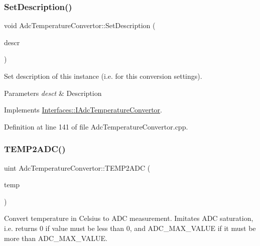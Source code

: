 \subsubsection{\texorpdfstring{Set\+Description()}{SetDescription()}}
{\footnotesize\ttfamily void Adc\+Temperature\+Convertor\+::\+Set\+Description (\begin{DoxyParamCaption}\item[{Q\+String}]{descr }\end{DoxyParamCaption})\hspace{0.3cm}{\ttfamily [virtual]}}



Set description of this instance (i.\+e. for this conversion settings). 


\begin{DoxyParams}{Parameters}
{\em desct} & Description \\
\hline
\end{DoxyParams}


Implements \hyperlink{class_interfaces_1_1_i_adc_temperature_convertor_a65bbef2300e21c495d95305921ddb74b}{Interfaces\+::\+I\+Adc\+Temperature\+Convertor}.



Definition at line 141 of file Adc\+Temperature\+Convertor.\+cpp.

\mbox{\label{class_adc_temperature_convertor_ae82f374826a431c837bdf796c593775b}} 
\subsubsection{\texorpdfstring{T\+E\+M\+P2\+A\+D\+C()}{TEMP2ADC()}}
{\footnotesize\ttfamily uint Adc\+Temperature\+Convertor\+::\+T\+E\+M\+P2\+A\+DC (\begin{DoxyParamCaption}\item[{double}]{temp }\end{DoxyParamCaption})\hspace{0.3cm}{\ttfamily [virtual]}}



Convert temperature in Celsius to A\+DC measurement. Imitates A\+DC saturation, i.\+e. returns 0 if value must be less than 0, and A\+D\+C\+\_\+\+M\+A\+X\+\_\+\+V\+A\+L\+UE if it must be more than A\+D\+C\+\_\+\+M\+A\+X\+\_\+\+V\+A\+L\+UE. 


